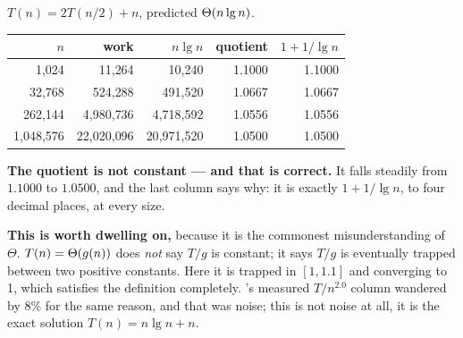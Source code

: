 \begin{worked}
$T(n) = 2T(n/2) + n$, predicted $\Theta(n \operatorname{lg} n)$.

\begin{center}
\begin{tabular}{@{}rrrrr@{}}
\toprule
\rowcolor{primary!15}
$n$ & work & $n \lg n$ & quotient & $1 + 1/\lg n$ \\
\midrule
      1{,}024 &       11{,}264 &       10{,}240 & 1.1000 & 1.1000 \\
     32{,}768 &      524{,}288 &      491{,}520 & 1.0667 & 1.0667 \\
    262{,}144 &    4{,}980{,}736 &    4{,}718{,}592 & 1.0556 & 1.0556 \\
1{,}048{,}576 &   22{,}020{,}096 &   20{,}971{,}520 & 1.0500 & 1.0500 \\
\bottomrule
\end{tabular}
\end{center}

\smallskip
\textbf{The quotient is not constant --- and that is correct.} It falls
steadily from $1.1000$ to $1.0500$, and the last column says why: it is exactly
$1 + 1/\lg n$, to four decimal places, at every size.

\smallskip
\textbf{This is worth dwelling on,} because it is the commonest
misunderstanding of $\Theta$. $T(n) = \Theta(g(n))$ does \emph{not} say
$T/g$ is constant; it says $T/g$ is eventually trapped between two positive
constants. Here it is trapped in $[1, 1.1]$ and converging to 1, which
satisfies the definition completely. 's measured $T/n^{2.0}$
column wandered by 8\% for the same reason, and that was noise; this is not
noise at all, it is the exact solution $T(n) = n\lg n + n$.
\end{worked}

